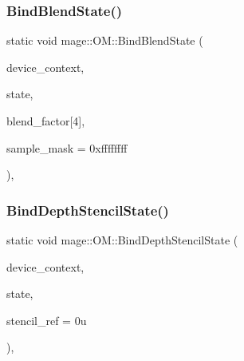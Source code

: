\subsubsection{\texorpdfstring{Bind\+Blend\+State()}{BindBlendState()}\hspace{0.1cm}{\footnotesize\ttfamily [2/2]}}
{\footnotesize\ttfamily static void mage\+::\+O\+M\+::\+Bind\+Blend\+State (\begin{DoxyParamCaption}\item[{I\+D3\+D11\+Device\+Context2 $\ast$}]{device\+\_\+context,  }\item[{I\+D3\+D11\+Blend\+State $\ast$}]{state,  }\item[{const F\+L\+O\+AT}]{blend\+\_\+factor\mbox{[}4\mbox{]},  }\item[{U\+I\+NT}]{sample\+\_\+mask = {\ttfamily 0xffffffff} }\end{DoxyParamCaption})\hspace{0.3cm}{\ttfamily [static]}, {\ttfamily [noexcept]}}

\hypertarget{structmage_1_1_o_m_a14f6a3fcf0678bf2092d443b06b3a925}{}\label{structmage_1_1_o_m_a14f6a3fcf0678bf2092d443b06b3a925} 
\subsubsection{\texorpdfstring{Bind\+Depth\+Stencil\+State()}{BindDepthStencilState()}}
{\footnotesize\ttfamily static void mage\+::\+O\+M\+::\+Bind\+Depth\+Stencil\+State (\begin{DoxyParamCaption}\item[{I\+D3\+D11\+Device\+Context2 $\ast$}]{device\+\_\+context,  }\item[{I\+D3\+D11\+Depth\+Stencil\+State $\ast$}]{state,  }\item[{U\+I\+NT}]{stencil\+\_\+ref = {\ttfamily 0u} }\end{DoxyParamCaption})\hspace{0.3cm}{\ttfamily [static]}, {\ttfamily [noexcept]}}

\hypertarget{structmage_1_1_o_m_a6c031fe0e62dfee63463f05e3fb63f97}{}\label{structmage_1_1_o_m_a6c031fe0e62dfee63463f05e3fb63f97} 
